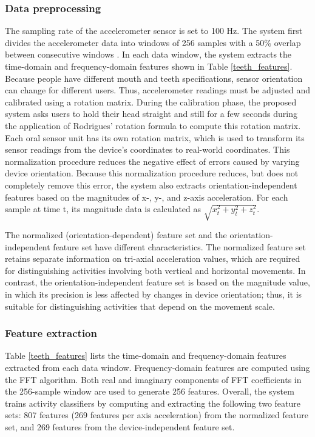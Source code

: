 \subsubsection{Data preprocessing}
The sampling rate of the accelerometer sensor is set to 100 Hz. The system first divides the accelerometer data into windows of 256 samples with a 50\% overlap between consecutive windows \cite{KristofVanLaerhoven:2000}. In each data window, the system extracts the time-domain and frequency-domain features shown in Table \ref{teeth_features}. 
Because people have different mouth and teeth specifications, sensor orientation can change for different users. Thus, accelerometer readings must be adjusted and calibrated using a rotation matrix. During the calibration phase, the proposed system asks users to hold their head straight and still for a few seconds during the application of Rodrigues' rotation formula to compute this rotation matrix. Each oral sensor unit has its own rotation matrix, which is used to transform its sensor readings from the device's coordinates to real-world coordinates. This normalization procedure reduces the negative effect of errors caused by varying device orientation. Because this normalization procedure reduces, but does not completely remove this error, the system also extracts orientation-independent features based on the magnitudes of x-, y-, and z-axis acceleration. For each sample at time t, its magnitude data is calculated as $\sqrt{x_{t}^{2}+y_{t}^{2}+z_{t}^{2}}$.


The normalized (orientation-dependent) feature set and the orientation-independent feature set have different characteristics. The normalized feature set retains separate information on tri-axial acceleration values, which are required for distinguishing activities involving both vertical and horizontal movements. In contrast, the orientation-independent feature set is based on the magnitude value, in which its precision is less affected by changes in device orientation; thus, it is suitable for distinguishing activities that depend on the movement scale.

\subsubsection{Feature extraction}
Table \ref{teeth_features} lists the time-domain and frequency-domain features extracted from each data window. Frequency-domain features are computed using the FFT algorithm. Both real and imaginary components of FFT coefficients in the 256-sample window are used to generate 256 features. Overall, the system trains activity classifiers by computing and extracting the following two feature sets: 807 features (269 features per axis acceleration) from the normalized feature set, and 269 features from the device-independent feature set.

